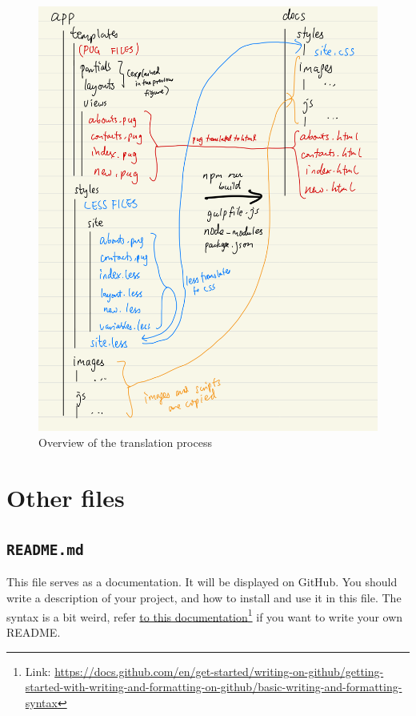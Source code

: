 \begin{figure}[h]
\centering
\includegraphics[width=15cm]{images/chn5-full-translation.png}
\caption{Overview of the translation process}
\end{figure}

\section{Other files}

\subsection{\texttt{README.md}}
\label{sec:readme}

This file serves as a documentation. It will be displayed on GitHub. You should write a description of your project, and how to install and use it in this file. The syntax is a bit weird, refer \href{https://docs.github.com/en/get-started/writing-on-github/getting-started-with-writing-and-formatting-on-github/basic-writing-and-formatting-syntax}{to this documentation}\footnote{Link: \url{https://docs.github.com/en/get-started/writing-on-github/getting-started-with-writing-and-formatting-on-github/basic-writing-and-formatting-syntax}} if you want to write your own README.

